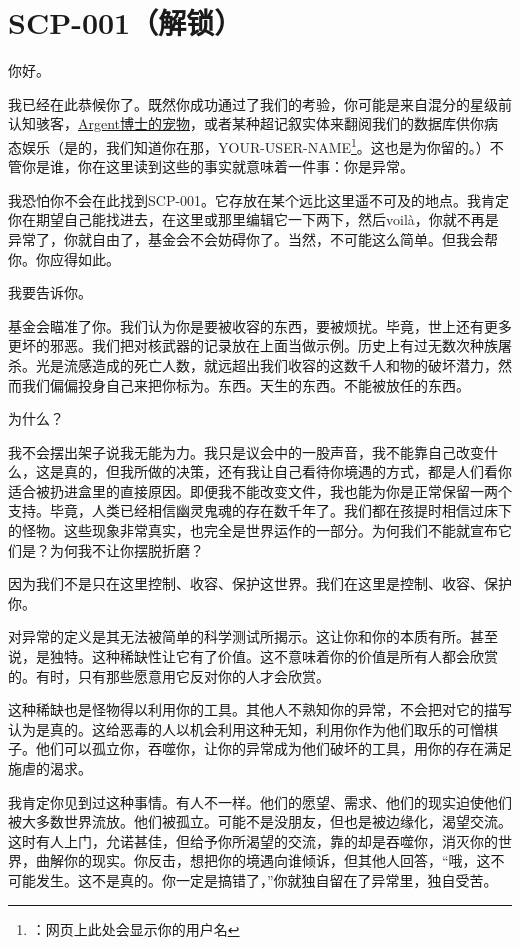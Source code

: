 \section{SCP-001（解锁）}

\label{sec:DOC-wjs-proposal-1}

你好。

我已经在此恭候你了。既然你成功通过了我们的考验，你可能是来自混分的星级前认知骇客，\hyperref[chap:SCP-301]{Argent博士的宠物}，或者某种超记叙实体来翻阅我们的数据库供你病态娱乐（是的，我们知道你在那，YOUR-USER-NAME\footnote{\QIS：网页上此处会显示你的用户名}。这也是为你留的。）不管你是谁，你在这里读到这些的事实就意味着一件事：你是异常。

我恐怕你不会在此找到SCP-001。它存放在某个远比这里遥不可及的地点。我肯定你在期望自己能找进去，在这里或那里编辑它一下两下，然后voilà，你就不再是异常了，你就自由了，基金会不会妨碍你了。当然，不可能这么简单。但我会帮你。你应得如此。

我要告诉你。

基金会瞄准了你。我们认为你是要被收容的东西，要被烦扰。毕竟，世上还有更多更坏的邪恶。我们把对核武器的记录放在上面当做示例。历史上有过无数次种族屠杀。光是流感造成的死亡人数，就远超出我们收容的这数千人和物的破坏潜力，然而我们偏偏投身自己来把你标为。东西。天生的东西。不能被放任的东西。

为什么？

我不会摆出架子说我无能为力。我只是议会中的一股声音，我不能靠自己改变什么，这是真的，但我所做的决策，还有我让自己看待你境遇的方式，都是人们看你适合被扔进盒里的直接原因。即便我不能改变文件，我也能为你是正常保留一两个支持。毕竟，人类已经相信幽灵鬼魂的存在数千年了。我们都在孩提时相信过床下的怪物。这些现象非常真实，也完全是世界运作的一部分。为何我们不能就宣布它们是？为何我不让你摆脱折磨？

因为我们不是只在这里控制、收容、保护这世界。我们在这里是控制、收容、保护你。

对异常的定义是其无法被简单的科学测试所揭示。这让你和你的本质有所。甚至说，是独特。这种稀缺性让它有了价值。这不意味着你的价值是所有人都会欣赏的。有时，只有那些愿意用它反对你的人才会欣赏。

这种稀缺也是怪物得以利用你的工具。其他人不熟知你的异常，不会把对它的描写认为是真的。这给恶毒的人以机会利用这种无知，利用你作为他们取乐的可憎棋子。他们可以孤立你，吞噬你，让你的异常成为他们破坏的工具，用你的存在满足施虐的渴求。

我肯定你见到过这种事情。有人不一样。他们的愿望、需求、他们的现实迫使他们被大多数世界流放。他们被孤立。可能不是没朋友，但也是被边缘化，渴望交流。这时有人上门，允诺甚佳，但给予你所渴望的交流，靠的却是吞噬你，消灭你的世界，曲解你的现实。你反击，想把你的境遇向谁倾诉，但其他人回答，“哦，这不可能发生。这不是真的。你一定是搞错了，”你就独自留在了异常里，独自受苦。

